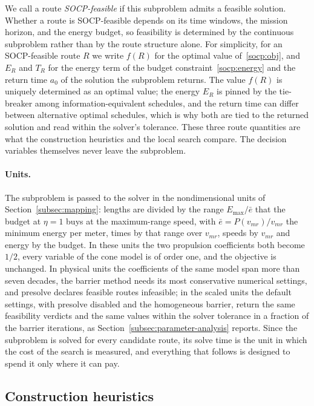 We call a route \emph{SOCP-feasible} if this subproblem admits a feasible solution. Whether a route is SOCP-feasible depends on its time windows, the mission horizon, and the energy budget, so feasibility is determined by the continuous subproblem rather than by the route structure alone. For simplicity, for an SOCP-feasible route $R$ we write $f(R)$ for the optimal value of~\eqref{socp:obj}, and $E_R$ and $T_R$ for the energy term of the budget constraint~\eqref{socp:energy} and the return time $a_0$ of the solution the subproblem returns. The value $f(R)$ is uniquely determined as an optimal value; the energy $E_R$ is pinned by the tie-breaker among information-equivalent schedules, and the return time can differ between alternative optimal schedules, which is why both are tied to the returned solution and read within the solver's tolerance. These three route quantities are what the construction heuristics and the local search compare. The decision variables themselves never leave the subproblem.

\paragraph{Units.}
The subproblem is passed to the solver in the nondimensional units of Section~\ref{subsec:mapping}: lengths are divided by the range $E_{\max}/\bar{e}$ that the budget at $\eta = 1$ buys at the maximum-range speed, with $\bar{e} = P(v_{mr})/v_{mr}$ the minimum energy per meter, times by that range over $v_{mr}$, speeds by $v_{mr}$ and energy by the budget. In these units the two propulsion coefficients both become $1/2$, every variable of the cone model is of order one, and the objective is unchanged. In physical units the coefficients of the same model span more than seven decades, the barrier method needs its most conservative numerical settings, and presolve declares feasible routes infeasible; in the scaled units the default settings, with presolve disabled and the homogeneous barrier, return the same feasibility verdicts and the same values within the solver tolerance in a fraction of the barrier iterations, as Section~\ref{subsec:parameter-analysis} reports. Since the subproblem is solved for every candidate route, its solve time is the unit in which the cost of the search is measured, and everything that follows is designed to spend it only where it can pay.

\subsection{Construction heuristics}\label{subsec:initial}

